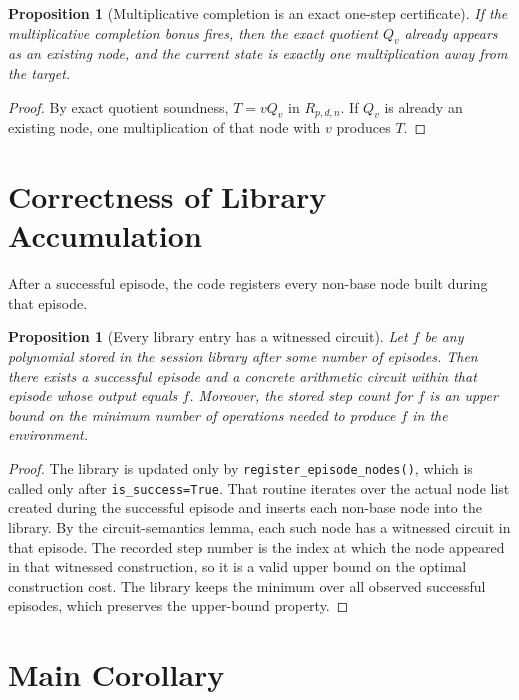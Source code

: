 \documentclass[11pt]{article}
\newtheorem{proposition}[theorem]{Proposition}
\theoremstyle{remark}
\begin{document}
\begin{proposition}[Multiplicative completion is an exact one-step certificate]
If the multiplicative completion bonus fires, then the exact quotient $Q_v$
already appears as an existing node, and the current state is exactly one
multiplication away from the target.
\end{proposition}

\begin{proof}
By exact quotient soundness, $T = v Q_v$ in $R_{p,d,n}$. If $Q_v$ is already an
existing node, one multiplication of that node with $v$ produces $T$.
\end{proof}

\section{Correctness of Library Accumulation}

After a successful episode, the code registers every non-base node built during
that episode.

\begin{proposition}[Every library entry has a witnessed circuit]
Let $f$ be any polynomial stored in the session library after some number of
episodes. Then there exists a successful episode and a concrete arithmetic
circuit within that episode whose output equals $f$. Moreover, the stored step
count for $f$ is an upper bound on the minimum number of operations needed to
produce $f$ in the environment.
\end{proposition}

\begin{proof}
The library is updated only by \texttt{register\_episode\_nodes()}, which is
called only after \texttt{is\_success=True}. That routine iterates over the
actual node list created during the successful episode and inserts each
non-base node into the library. By the circuit-semantics lemma, each such node
has a witnessed circuit in that episode. The recorded step number is the index
at which the node appeared in that witnessed construction, so it is a valid
upper bound on the optimal construction cost. The library keeps the minimum over
all observed successful episodes, which preserves the upper-bound property.
\end{proof}

\section{Main Corollary}
\end{document}

